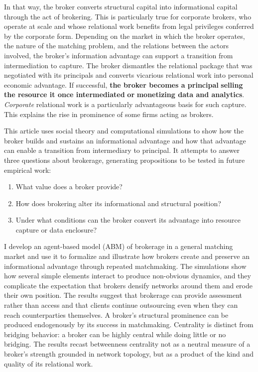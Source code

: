 \documentclass[
]{article}
\begin{document}
In that way, the broker converts structural capital into informational capital through the act of brokering. This is particularly true for corporate brokers, who operate at scale and whose relational work benefits from legal privileges conferred by the corporate form. Depending on the market in which the broker operates, the nature of the matching problem, and the relations between the actors involved, the broker's information advantage can support a transition from intermediation to capture. The broker dismantles the relational package that was negotiated with its principals and converts vicarious relational work into personal economic advantage. If successful, \textbf{the broker becomes a principal} \textbf{selling} \textbf{the resource it once intermediated} \textbf{or} \textbf{monetizing data and analytics}. \emph{Corporate} relational work is a particularly advantageous basis for such capture. This explains the rise in prominence of some firms acting as brokers.

This article uses social theory and computational simulations to show how the broker builds and sustains an informational advantage and how that advantage can enable a transition from intermediary to principal. It attempts to answer three questions about brokerage, generating propositions to be tested in future empirical work:

\begin{enumerate}
\def\labelenumi{(\roman{enumi})}
\item What value does a broker provide?
\item How does brokering alter its informational and structural position?
\item Under what conditions can the broker convert its advantage into resource capture or data enclosure?
\end{enumerate}

I develop an agent-based model (ABM) of brokerage in a general matching market and use it to formalize and illustrate how brokers create and preserve an informational advantage through repeated matchmaking. The simulations show how several simple elements interact to produce non-obvious dynamics, and they complicate the expectation that brokers densify networks around them and erode their own position. The results suggest that brokerage can provide assessment rather than access and that clients continue outsourcing even when they can reach counterparties themselves. A broker's structural prominence can be produced endogenously by its success in matchmaking. Centrality is distinct from bridging behavior: a broker can be highly central while doing little or no bridging. The results recast betweenness centrality not as a neutral measure of a broker's strength grounded in network topology, but as a product of the kind and quality of its relational work.
\end{document}
